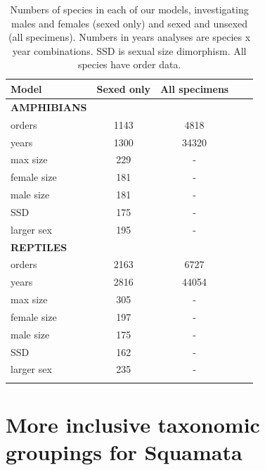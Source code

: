 \documentclass[a4paper, 12pt]{article}
\begin{document}
\begin{table}[H]
\centering
\begin{tabular}{lcccc}

  \hline
  \textbf{Model} & \textbf{Sexed only} & \textbf{All specimens}\\ 
  \hline
  \textbf{AMPHIBIANS} & &\\
  \hline
  orders & 1143 & 4818\\
  years & 1300 & 34320\\
  max size & 229 & -\\
  female size & 181 & -\\
  male size & 181 & -\\
  SSD & 175 & -\\
  larger sex & 195 & -\\
  \hline
  \textbf{REPTILES} & &\\
  \hline
  orders & 2163 & 6727\\
  years & 2816 & 44054\\
  max size & 305 & -\\
  female size & 197 & -\\
  male size & 175 & -\\
  SSD & 162  & -\\
  larger sex & 235  & -\\
  \hline

\label{table_numbers}
\end{tabular}
\caption{Numbers of species in each of our models, investigating males and females (sexed only) and sexed and unsexed (all specimens). Numbers in years analyses are species x year combinations. SSD is sexual size dimorphism. All species have order data.} 

\end{table}

\newpage
\section{More inclusive taxonomic groupings for Squamata}
%
\end{document}
